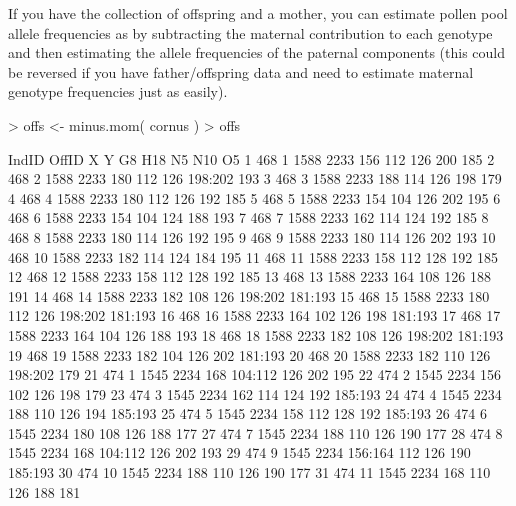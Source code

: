 \documentclass[letterpaper,twoside,openany]{book}
\begin{document}
If you have the collection of offspring and a mother, you can estimate pollen pool allele frequencies as by subtracting the maternal contribution to each genotype and then estimating the allele frequencies of the paternal components (this could be reversed if you have father/offspring data and need to estimate maternal genotype frequencies just as easily).

\begin{Schunk}
\begin{Sinput}
> offs <- minus.mom( cornus )
> offs
\end{Sinput}
\begin{Soutput}
   IndID OffID    X    Y      G8     H18  N5     N10      O5
1    468     1 1588 2233     156     112 126     200     185
2    468     2 1588 2233     180     112 126 198:202     193
3    468     3 1588 2233     188     114 126     198     179
4    468     4 1588 2233     180     112 126     192     185
5    468     5 1588 2233     154     104 126     202     195
6    468     6 1588 2233     154     104 124     188     193
7    468     7 1588 2233     162     114 124     192     185
8    468     8 1588 2233     180     114 126     192     195
9    468     9 1588 2233     180     114 126     202     193
10   468    10 1588 2233     182     114 124     184     195
11   468    11 1588 2233     158     112 128     192     185
12   468    12 1588 2233     158     112 128     192     185
13   468    13 1588 2233     164     108 126     188     191
14   468    14 1588 2233     182     108 126 198:202 181:193
15   468    15 1588 2233     180     112 126 198:202 181:193
16   468    16 1588 2233     164     102 126     198 181:193
17   468    17 1588 2233     164     104 126     188     193
18   468    18 1588 2233     182     108 126 198:202 181:193
19   468    19 1588 2233     182     104 126     202 181:193
20   468    20 1588 2233     182     110 126 198:202     179
21   474     1 1545 2234     168 104:112 126     202     195
22   474     2 1545 2234     156     102 126     198     179
23   474     3 1545 2234     162     114 124     192 185:193
24   474     4 1545 2234     188     110 126     194 185:193
25   474     5 1545 2234     158     112 128     192 185:193
26   474     6 1545 2234     180     108 126     188     177
27   474     7 1545 2234     188     110 126     190     177
28   474     8 1545 2234     168 104:112 126     202     193
29   474     9 1545 2234 156:164     112 126     190 185:193
30   474    10 1545 2234     188     110 126     190     177
31   474    11 1545 2234     168     110 126     188     181

\end{Soutput}
\end{Schunk}
\end{document}
